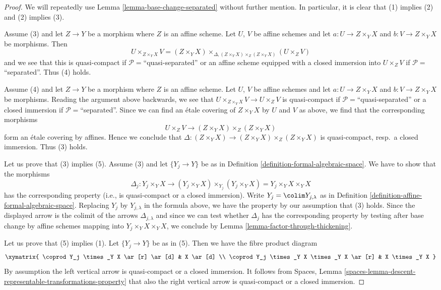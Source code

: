 \begin{proof}
We will repeatedly use
Lemma \ref{lemma-base-change-separated}
without further mention. In particular, it is clear that
(1) implies (2) and (2) implies (3).

\medskip\noindent
Assume (3) and let $Z \to Y$ be a morphism where $Z$ is an affine scheme.
Let $U$, $V$ be affine schemes and let $a : U \to Z \times_Y X$
and $b : V \to Z \times_Y X$ be morphisms. Then
$$
U \times_{Z \times_Y X} V =
(Z \times_Y X) \times_{\Delta, (Z \times_Y X) \times_Z (Z \times_Y X)}
(U \times_Z V)
$$
and we see that this is quasi-compact if $\mathcal{P} =$``quasi-separated''
or an affine scheme equipped with a closed immersion into
$U \times_Z V$ if $\mathcal{P} =$``separated''. Thus (4) holds.

\medskip\noindent
Assume (4) and let $Z \to Y$ be a morphism where $Z$ is an affine scheme.
Let $U$, $V$ be affine schemes and let $a : U \to Z \times_Y X$
and $b : V \to Z \times_Y X$ be morphisms. Reading the argument above
backwards, we see that $U \times_{Z \times_Y X} V \to U \times_Z V$
is quasi-compact if $\mathcal{P} =$``quasi-separated'' or a closed
immersion if $\mathcal{P} =$``separated''. Since we can find an
\'etale covering of $Z \times_Y X$ by $U$ and $V$ as above, we find
that the corresponding morphisms
$$
U \times_Z V \to (Z \times_Y X) \times_Z (Z \times_Y X)
$$
form an \'etale covering by affines. Hence we conclude that
$\Delta : (Z \times_Y X) \to (Z \times_Y X) \times_Z (Z \times_Y X)$
is quasi-compact, resp.\ a closed immersion. Thus (3) holds.

\medskip\noindent
Let us prove that (3) implies (5). Assume (3) and let
$\{Y_j \to Y\}$ be as in
Definition \ref{definition-formal-algebraic-space}.
We have to show that the morphisms
$$
\Delta_j :
Y_j \times_Y X
\longrightarrow
(Y_j \times_Y X) \times_{Y_j} (Y_j \times_Y X) =
Y_j \times_Y X \times_Y X
$$
has the corresponding property (i.e., is quasi-compact or a closed immersion).
Write $Y_j = \colim Y_{j, \lambda}$ as in
Definition \ref{definition-affine-formal-algebraic-space}.
Replacing $Y_j$ by $Y_{j, \lambda}$ in the formula above, we have the
property by our assumption that (3) holds. Since the displayed arrow
is the colimit of the arrows $\Delta_{j, \lambda}$ and since we
can test whether $\Delta_j$ has the corresponding property by
testing after base change by affine schemes mapping into
$Y_j \times_Y X \times_Y X$, we conclude by
Lemma \ref{lemma-factor-through-thickening}.

\medskip\noindent
Let us prove that (5) implies (1). Let $\{Y_j \to Y\}$ be as in (5).
Then we have the fibre product diagram
$$
\xymatrix{
\coprod Y_j \times_Y X \ar[r] \ar[d] &
X \ar[d] \\
\coprod Y_j \times_Y X \times_Y X \ar[r] &
X \times_Y X
}
$$
By assumption the left vertical arrow is quasi-compact or a closed immersion.
It follows from
Spaces, Lemma \ref{spaces-lemma-descent-representable-transformations-property}
that also the right vertical arrow is quasi-compact or a
closed immersion.
\end{proof}







